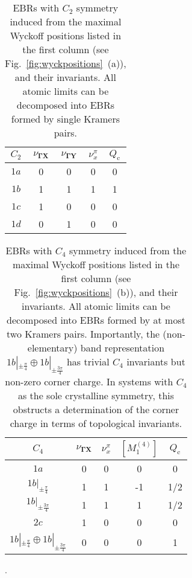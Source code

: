 \begin{table}[H]
\centering
\begin{tabular}{|c||c|c|c||c|}
\hline
$C_2$ & $\nu_{\mathbf{\Gamma X}}$ & $\nu_{\mathbf{\Gamma Y}}$ & $\nu_{x}^{\pi}$ & $Q_\mathrm{c}$ \\ \hline
$1a$  & 0                      & 0            & 0          & 0               \\ \hline
$1b$  & 1                      & 1            & 1          & 1               \\ \hline
$1c$  & 1                      & 0            & 0          & 0               \\ \hline
$1d$  & 0                      & 1            & 0          & 0               \\ \hline
\end{tabular}
\caption[EBRs with $C_2$ symmetry induced from the maximal Wyckoff positions and their invariants]{EBRs with $C_2$ symmetry induced from the maximal Wyckoff positions listed in the first column (see Fig.~\ref{fig:wyckpositions}~(a)), and their invariants. All atomic limits can be decomposed into EBRs formed by single Kramers pairs.}
\label{tab:EBRc2} 
\end{table}

\begin{table}[H]
\centering
\begin{tabular}{|c||c|c|c||c|}
\hline
$C_4$ & $\nu_{\mathbf{\Gamma X}}$ & $\nu_{x}^{\pi}$  & $[M_1^{(4)}]$ & $Q_\mathrm{c}$ \\ \hline
$1a$  & 0          & 0           & 0                       & 0              \\ \hline
$1b|_{\pm \frac{\pi}{4}}$  & 1          & 1           & -1                       & 1/2            \\ \hline
$1b|_{\pm \frac{3\pi}{4}}$  & 1          & 1           & 1                       & 1/2            \\ \hline
$2c$  & 1          & 0           & 0                       & 0                \\ \hline
$1b|_{\pm \frac{\pi}{4}} \oplus  1b|_{\pm \frac{3\pi}{4}}$  & 0          & 0           & 0                       & 1            \\ \hline
\end{tabular}
\caption[EBRs with $C_4$ symmetry induced from the maximal Wyckoff positions and their invariants]{EBRs with $C_4$ symmetry induced from the maximal Wyckoff positions listed in the first column (see Fig.~\ref{fig:wyckpositions}~(b)), and their invariants. All atomic limits can be decomposed into EBRs formed by at most two Kramers pairs. Importantly, the (non-elementary) band representation $1b|_{\pm \frac{\pi}{4}} \oplus  1b|_{\pm \frac{3\pi}{4}}$ has trivial $C_4$ invariants but non-zero corner charge. In systems with $C_4$ as the sole crystalline symmetry, this obstructs a determination of the corner charge in terms of topological invariants.}
.\label{tab:EBRc4}
\end{table}

